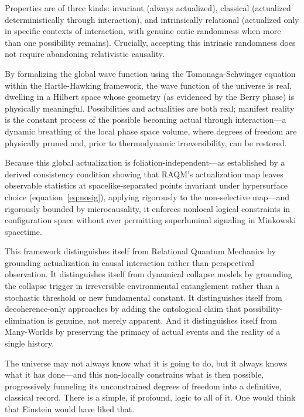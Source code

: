 \documentclass[11pt,a4paper]{article}
\theoremstyle{plain}
\theoremstyle{definition}
\theoremstyle{remark}
\begin{document}
\noindent
Properties are of three kinds: invariant (always actualized), classical (actualized
deterministically through interaction), and intrinsically relational (actualized
only in specific contexts of interaction, with genuine ontic randomness when more
than one possibility remains). Crucially, accepting this intrinsic randomness does
not require abandoning relativistic causality.

By formalizing the global wave function using the Tomonaga-Schwinger equation
within the Hartle-Hawking framework, the wave function of the universe is real,
dwelling in a Hilbert space whose geometry (as evidenced by the Berry phase) is
physically meaningful. Possibilities and actualities are both real; manifest
reality is the constant process of the possible becoming actual through
interaction---a dynamic breathing of the local phase space volume, where degrees of
freedom are physically pruned and, prior to thermodynamic irreversibility, can be
restored.

Because this global actualization is foliation-independent---as established by a
derived consistency condition showing that RAQM's actualization map leaves
observable statistics at spacelike-separated points invariant under hypersurface
choice (equation~\ref{eq:nosig}), applying rigorously to the non-selective
map---and rigorously bounded by microcausality, it enforces nonlocal logical
constraints in configuration space without ever permitting superluminal signaling
in Minkowski spacetime.

This framework distinguishes itself from Relational Quantum Mechanics by grounding
actualization in causal interaction rather than perspectival observation. It
distinguishes itself from dynamical collapse models by grounding the collapse
trigger in irreversible environmental entanglement rather than a stochastic
threshold or new fundamental constant. It distinguishes itself from
decoherence-only approaches by adding the ontological claim that
possibility-elimination is genuine, not merely apparent. And it distinguishes
itself from Many-Worlds by preserving the primacy of actual events and the reality
of a single history.

The universe may not always know what it is going to do, but it always knows what
it has done---and this non-locally constrains what is then possible, progressively
funneling its unconstrained degrees of freedom into a definitive, classical record.
There is a simple, if profound, logic to all of it. One would think that Einstein
would have liked that.
\end{document}
